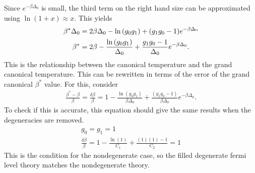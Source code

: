 Since $e^{-\beta\Delta_0}$ is small, the third term on the right hand size can be approximated using $\ln(1+x)\approx x$. This yields
\begin{align}
    \beta^*\Delta_0&=2\beta\Delta_0-\ln\qty(g_0g_1)+(g_1g_0-1)e^{-\beta\Delta_0}\nonumber\\
    \beta^*&=2\beta-\frac{\ln\qty(g_0g_1)}{\Delta_0}+\frac{g_1g_0-1}{\Delta_0}e^{-\beta\Delta_0}.
\end{align} 
This is the relationship between the canonical temperature and the grand canonical temperature. This can be rewritten in terms of the error of the grand canonical $\beta^*$ value. For this, consider 
\begin{align}
    \frac{\beta^*-\beta}{\beta}=\frac{\delta\beta}{\beta}=1-\frac{\ln(g_0g_1)}{\beta\Delta_0}+\frac{(g_1g_0 - 1)}{\beta \Delta_0}e^{-\beta\Delta_0}.
\end{align}
To check if this is accurate, this equation should give the same results when the degeneracies are removed.
\begin{gather}
    g_0=g_1=1\nonumber\\
    \frac{\delta\beta}{\beta}=1-\frac{\ln(1)}{C_1}+\frac{(1)(1)-1}{C_2}=1\nonumber
\end{gather}
This is the condition for the nondegenerate case, so the filled degenerate fermi level theory matches the nondegenerate theory. 
